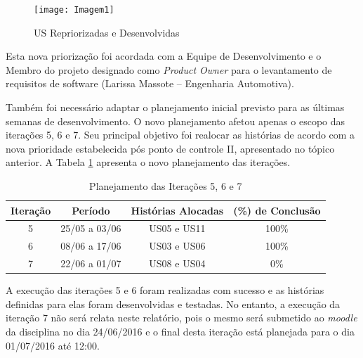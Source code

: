 		\begin{figure}[htpb]
			\centering
			\texttt{[image: Imagem1]}
			\caption{US Repriorizadas e Desenvolvidas}
			\label{Imagem1}
		\end{figure}

		Esta nova priorização foi acordada com a Equipe de Desenvolvimento e o Membro do projeto designado como \textit{Product Owner} para o levantamento de requisitos de software (Larissa Massote – Engenharia Automotiva).


		Também foi necessário adaptar o planejamento inicial previsto para as últimas semanas de desenvolvimento. O novo planejamento afetou apenas o escopo das iterações 5, 6 e 7. Seu principal objetivo foi realocar as histórias de acordo com a nova prioridade estabelecida pós ponto de controle II, apresentado no tópico anterior. A Tabela \ref{Tabela1} apresenta o novo planejamento das iterações.

		\begin{table}[htpb]
		\centering
		\caption{Planejamento das Iterações 5, 6 e 7}
		\label{Tabela1}
		\begin{tabular}{|c|c|c|c|}
		\hline
		\rowcolor[HTML]{C0C0C0} 
		{\color[HTML]{000000} \textbf{Iteração}} & {\color[HTML]{000000} \textbf{Período}} & {\color[HTML]{000000} \textbf{Histórias Alocadas}} & {\color[HTML]{000000} \textbf{(\%) de Conclusão}} \\ \hline
		{\color[HTML]{000000} 5} & {\color[HTML]{000000} 25/05 a 03/06} & {\color[HTML]{000000} US05 e US11} & {\color[HTML]{000000} 100\%} \\ \hline
		{\color[HTML]{000000} 6} & {\color[HTML]{000000} 08/06 a 17/06} & {\color[HTML]{000000} US03 e US06} & {\color[HTML]{000000} 100\%} \\ \hline
		{\color[HTML]{000000} 7} & {\color[HTML]{000000} 22/06 a 01/07} & {\color[HTML]{000000} US08 e US04} & {\color[HTML]{000000} 0\%} \\ \hline
		\end{tabular}
		\end{table}

		A execução das iterações 5 e 6 foram realizadas com sucesso e as histórias definidas para elas foram desenvolvidas e testadas. No entanto, a execução da iteração 7 não será relata neste relatório, pois o mesmo será submetido ao \textit{moodle} da disciplina no dia 24/06/2016 e o final desta iteração está planejada para o dia 01/07/2016 até 12:00.
		
